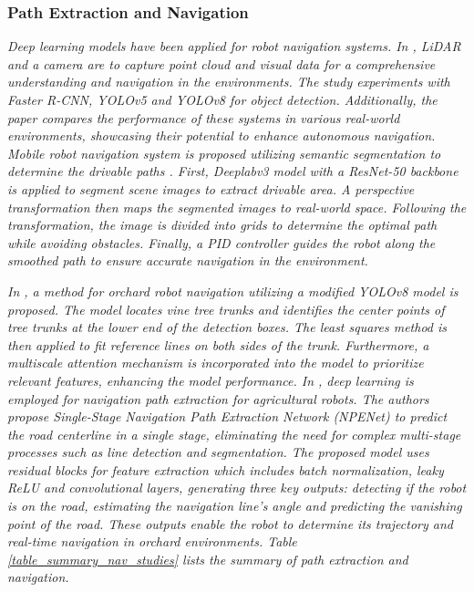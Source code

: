\documentclass[preprint,12pt]{elsarticle}
\begin{document}
\subsubsection{Path Extraction and Navigation}
\emph{Deep learning models have been applied for robot navigation systems. In \citep{alotaibi_deep_2024}, LiDAR and a camera are to capture point cloud and visual data for a comprehensive understanding and navigation in the environments. The study experiments with Faster R-CNN, YOLOv5 and YOLOv8 for object detection. Additionally, the paper compares the performance of these systems in various real-world environments, showcasing their potential to enhance autonomous navigation. Mobile robot navigation system is proposed utilizing semantic segmentation to determine the drivable paths \citep{misir_drivable_2024}. First, Deeplabv3 \citep{chen_rethinking_2017} model with a ResNet-50 backbone is applied to segment scene images to extract drivable area. A perspective transformation then maps the segmented images to real-world space. Following the transformation, the image is divided into grids to determine the optimal path while avoiding obstacles. Finally, a PID controller guides the robot along the smoothed path to ensure accurate navigation in the environment.}

\emph{In \citep{cao_orchard_2024}, a method for orchard robot navigation utilizing a modified YOLOv8 model is proposed. The model locates vine tree trunks and identifies the center points of tree trunks at the lower end of the detection boxes. The least squares method is then applied to fit reference lines on both sides of the trunk. Furthermore, a multiscale attention mechanism is incorporated into the model to prioritize relevant features, enhancing the model performance. In \citep{liu_single-stage_2025}, deep learning is employed for navigation path extraction for agricultural robots. The authors propose Single-Stage Navigation Path Extraction Network (NPENet) to predict the road centerline in a single stage, eliminating the need for complex multi-stage processes such as line detection and segmentation. The proposed model uses residual blocks for feature extraction which includes batch normalization, leaky ReLU and convolutional layers, generating three key outputs: detecting if the robot is on the road, estimating the navigation line's angle and predicting the vanishing point of the road. These outputs enable the robot to determine its trajectory and real-time navigation in orchard environments. Table \ref{table_summary_nav_studies} lists the summary of path extraction and navigation.}
\end{document}
